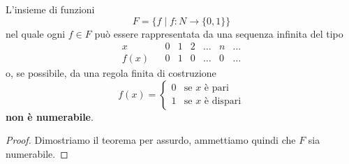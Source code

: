 \begin{theorem}
	L'insieme di funzioni
	\[ F = \{ f \mid f : N \rightarrow \{0, 1\} \} \]
	nel quale ogni $f \in F$ pu\`o essere rappresentata da una sequenza infinita del tipo
	\[
		\begin{matrix}
			x    &  & 0 & 1 & 2 & \dots & n & \dots \\
			f(x) &  & 0 & 1 & 0 & \dots & 0 & \dots
		\end{matrix}
	\]
	o, se possibile, da una regola finita di costruzione
	\[
		f(x) = \begin{cases}
			0 & \text{se } x \text{ \`e pari}    \\
			1 & \text{se } x \text{ \`e dispari}
		\end{cases}
	\]
	\textbf{non \`e numerabile}.

	\begin{proof}
		Dimostriamo il teorema per assurdo, ammettiamo quindi che $F$ sia numerabile.


\end{proof}
\end{theorem}
